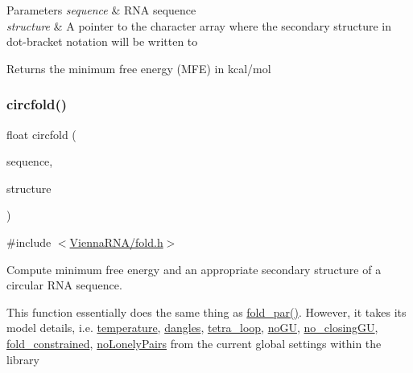 \begin{DoxyParams}{Parameters}
{\em sequence} & R\+NA sequence \\
\hline
{\em structure} & A pointer to the character array where the secondary structure in dot-\/bracket notation will be written to \\
\hline
\end{DoxyParams}
\begin{DoxyReturn}{Returns}
the minimum free energy (M\+FE) in kcal/mol 
\end{DoxyReturn}
\mbox{\label{group__mfe__fold__single_ga4ac63ab3e8d9a80ced28b8052d94e423}} 
\subsubsection{\texorpdfstring{circfold()}{circfold()}}
{\footnotesize\ttfamily float circfold (\begin{DoxyParamCaption}\item[{const char $\ast$}]{sequence,  }\item[{char $\ast$}]{structure }\end{DoxyParamCaption})}



{\ttfamily \#include $<$\mbox{\hyperlink{fold_8h}{Vienna\+R\+N\+A/fold.\+h}}$>$}



Compute minimum free energy and an appropriate secondary structure of a circular R\+NA sequence. 

This function essentially does the same thing as \mbox{\hyperlink{group__mfe__fold__single_ga2bc41df5d71fee6fd8da9904ee65d8fb}{fold\+\_\+par()}}. However, it takes its model details, i.\+e. \mbox{\hyperlink{group__model__details_gab4b11c8d9c758430960896bc3fe82ead}{temperature}}, \mbox{\hyperlink{group__model__details_ga72b511ed1201f7e23ec437e468790d74}{dangles}}, \mbox{\hyperlink{group__model__details_ga4f6265bdf0ead7ff4628a360adbfd77e}{tetra\+\_\+loop}}, \mbox{\hyperlink{group__model__details_gabf380d09e4f1ab94fc6af57cf0ad5d32}{no\+GU}}, \mbox{\hyperlink{group__model__details_gaa8d1c7b92489179e1eafa562b7bdd259}{no\+\_\+closing\+GU}}, \mbox{\hyperlink{fold__vars_8h_a0afc287c2464866d94858c39175154af}{fold\+\_\+constrained}}, \mbox{\hyperlink{group__model__details_ga097eccaabd6ae8b4fef83cccff85bb5d}{no\+Lonely\+Pairs}} from the current global settings within the library

